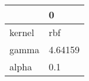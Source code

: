 \begin{tabular}{ll}
\toprule
{} &        0 \\
\midrule
kernel &      rbf \\
gamma  &  4.64159 \\
alpha  &      0.1 \\
\bottomrule
\end{tabular}
